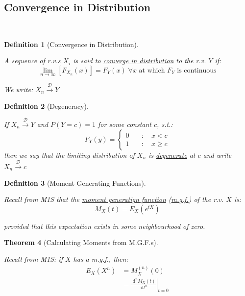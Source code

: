 \documentclass[12pt,a4paper]{article}
\newtheorem{thm}{Theorem}[subsection]
\newtheorem{defn}[thm]{Definition}
\newcommand{\diff}{\;\mathrm{d}}
\begin{document}
\subsection{Convergence in Distribution}$\;$

\begin{defn}[Convergence in Distribution]$\;$\par\vspace{1cm}

A sequence of r.v.s $X_i$ is said to \underline{converge in distribution} to the r.v. $Y$ if:
$$\lim_{n\to\infty}\left[F_{X_n}(x)\right] = F_Y(x) \;\mbox{$\forall x$ at which $F_Y$ is continuous}$$

We write: $X_n \xrightarrow{\mathscr{D}}Y$

\end{defn}

\begin{defn}[Degeneracy]$\;$\par\vspace{1cm}

If $X_n \xrightarrow{\mathscr{D}} Y$ and $P(Y=c) = 1$ for some constant $c$, s.t.:
$$F_Y(y) = \left\{\begin{array}{cc} 0\quad &:\quad x<c\\ 1\quad&:\quad x\geq c \end{array}\right.$$
then we say that the limiting distribution of $X_n$ is \underline{degenerate} at $c$ and write $X_n \xrightarrow{\mathscr{D}} c$

\end{defn}

\begin{defn}[Moment Generating Functions]$\;$\par\vspace{1cm}

Recall from M1S that the \underline{moment generatign function} (\underline{m.g.f.}) of the r.v. $X$ is:
$$M_X(t) = E_X(e^{tX})$$

provided that this expectation exists in some neighbourhood of zero.

\end{defn}

\begin{thm}[Calculating Moments from M.G.F.s]$\;$\par\vspace{1cm}

Recall from M1S: if $X$ has a m.g.f., then:
\begin{align*}
E_X(X^n) &= M_X^{(n)}(0)\\
&= \left.\frac{\diff^n M_X(t)}{\diff t^n}\right|_{t=0}
\end{align*}

\end{thm}
\end{document}
